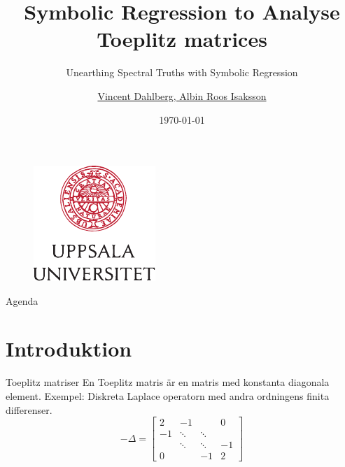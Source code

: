 \documentclass{beamer}
\author[V. Dahlberg, A. Roos Isaksson, \contact]{\href{}{Vincent Dahlberg, Albin Roos Isaksson}}
\institute[IT Dep, UU]{\href{}{IT Department, Uppsala University}
    \\ \smallskip \contact}
\title[SR to Analyse Toeplitz]{Symbolic Regression to Analyse Toeplitz matrices}
\subtitle[\shortconference]{Unearthing Spectral Truths with Symbolic Regression}
\date[June 2025]{\small \today
    \\ \fullconference}
\begin{document}
{

\begin{frame}\label{start}
    \titlepage
    \begin{figure}
            \includegraphics[scale=0.65]{style/uu_logo.pdf} 
    \end{figure}
\end{frame}
}

\begin{frame}{Agenda}
    \tableofcontents[sectionstyle=show, subsectionstyle=show/shaded/hide, subsubsectionstyle=show/shaded/hide]
\end{frame}


\section{Introduktion}

\begin{frame}{Toeplitz matriser}
En Toeplitz matris är en matris med konstanta diagonala element. Exempel: Diskreta Laplace operatorn med andra ordningens finita differenser.
    \begin{equation}
        -\Delta = \begin{bmatrix}
        2 & -1 &  &  0\\
        -1 & \ddots & \ddots &  \\
         & \ddots & \ddots & -1 \\
         0& & -1 & 2
    \end{bmatrix}
    \end{equation}
\end{frame}
\end{document}
